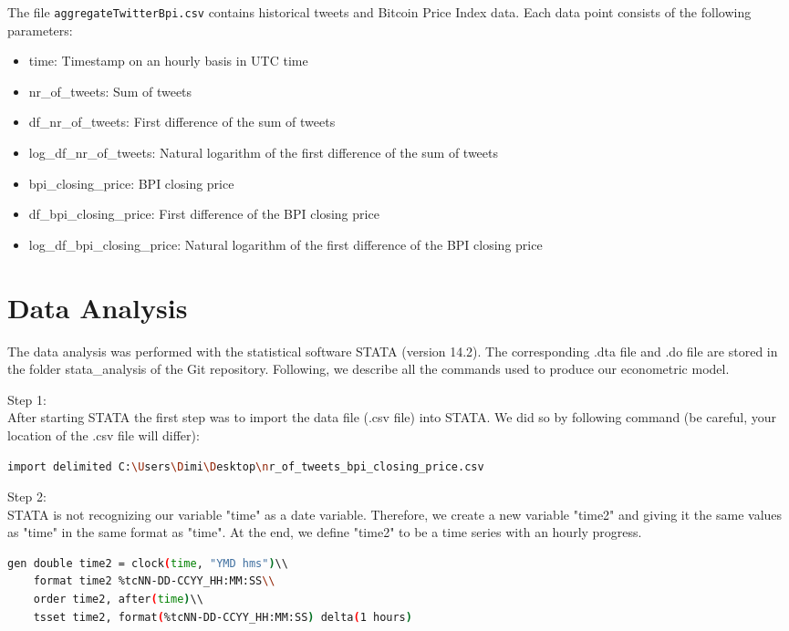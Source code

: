 \documentclass[a4paper,12pt]{article}
\begin{document}
\begin{spacing}{1.2}
The file \verb|aggregateTwitterBpi.csv| contains historical tweets and Bitcoin Price Index data. Each data point consists of the following parameters:
\begin{itemize}
    \item time: Timestamp on an hourly basis in UTC time
    \item {nr\_of\_tweets}: Sum of tweets
    \item {df\_nr\_of\_tweets}: First difference of the sum of tweets
    \item {log\_df\_nr\_of\_tweets}: Natural logarithm of the first difference of the sum of tweets
    \item {bpi\_closing\_price}: BPI closing price
    \item {df\_bpi\_closing\_price}: First difference of the BPI closing price
    \item {log\_df\_bpi\_closing\_price}: Natural logarithm of the first difference of the BPI closing price
\end{itemize}

\clearpage

\section{Data Analysis}
The data analysis was performed with the statistical software STATA (version 14.2). The corresponding .dta file and .do file are stored in the folder stata\_analysis of the Git repository. Following, we describe all the commands used to produce our econometric model.

Step 1:\\
After starting STATA the first step was to import the data file (.csv file) into STATA. We did so by following command (be careful, your location of the .csv file will differ):\\
\begin{lstlisting}[language=bash]
    import delimited C:\Users\Dimi\Desktop\nr_of_tweets_bpi_closing_price.csv
\end{lstlisting}

Step 2:\\
STATA is not recognizing our variable "time" as a date variable. Therefore, we create a new variable "time2" and giving it the same values as "time" in the same format as "time". At the end, we define "time2" to be a time series with an hourly progress.\\
	\begin{lstlisting}[language=bash]
	gen double time2 = clock(time, "YMD hms")\\
	format time2 %tcNN-DD-CCYY_HH:MM:SS\\
	order time2, after(time)\\
	tsset time2, format(%tcNN-DD-CCYY_HH:MM:SS) delta(1 hours)
	\end{lstlisting}


\end{spacing}
\end{document}
